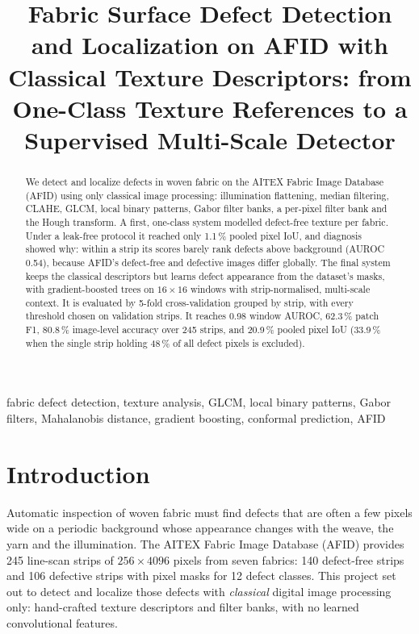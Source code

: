 \documentclass[conference]{IEEEtran}
\begin{document}
\title{Fabric Surface Defect Detection and Localization on AFID with Classical Texture Descriptors: from One-Class Texture References to a Supervised Multi-Scale Detector}

\author{
}

\maketitle

\begin{abstract}
We detect and localize defects in woven fabric on the AITEX Fabric Image Database (AFID) using only classical image processing: illumination flattening, median filtering, CLAHE, GLCM, local binary patterns, Gabor filter banks, a per-pixel filter bank and the Hough transform. A first, one-class system modelled defect-free texture per fabric. Under a leak-free protocol it reached only 1.1\,\% pooled pixel IoU, and diagnosis showed why: within a strip its scores barely rank defects above background (AUROC 0.54), because AFID's defect-free and defective images differ globally. The final system keeps the classical descriptors but learns defect appearance from the dataset's masks, with gradient-boosted trees on $16\times16$ windows with strip-normalised, multi-scale context. It is evaluated by 5-fold cross-validation grouped by strip, with every threshold chosen on validation strips. It reaches 0.98 window AUROC, 62.3\,\% patch F1, 80.8\,\% image-level accuracy over 245 strips, and 20.9\,\% pooled pixel IoU (33.9\,\% when the single strip holding 48\,\% of all defect pixels is excluded).
\end{abstract}

\begin{IEEEkeywords}
fabric defect detection, texture analysis, GLCM, local binary patterns, Gabor filters, Mahalanobis distance, gradient boosting, conformal prediction, AFID
\end{IEEEkeywords}

\section{Introduction}
Automatic inspection of woven fabric must find defects that are often a few pixels wide on a periodic background whose appearance changes with the weave, the yarn and the illumination. The AITEX Fabric Image Database (AFID) \cite{silvestre2019} provides 245 line-scan strips of $256\times4096$ pixels from seven fabrics: 140 defect-free strips and 106 defective strips with pixel masks for 12 defect classes. This project set out to detect and localize those defects with \emph{classical} digital image processing only: hand-crafted texture descriptors and filter banks, with no learned convolutional features.
\end{document}
